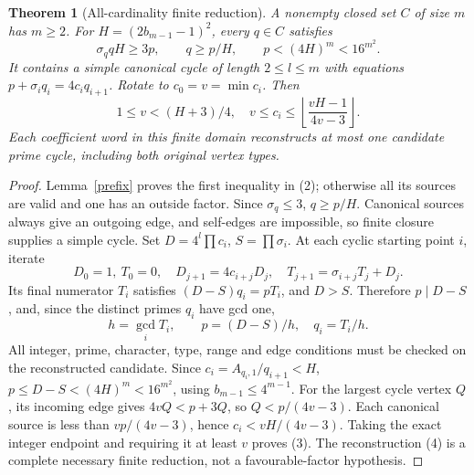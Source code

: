 \documentclass[11pt,reqno]{amsart}
\newtheorem{theorem}{Theorem}\newtheorem{lemma}[theorem]{Lemma}
\begin{document}
\begin{theorem}[All-cardinality finite reduction]\label{height}
A nonempty closed set $C$ of size $m$ has $m\ge2$. For
$H=(2b_{m-1}-1)^2$, every $q\in C$ satisfies
\[
 \boxed{\sigma_q qH\ge3p,\qquad q\ge p/H,\qquad p<(4H)^m<16^{m^2}.} \tag{2}
\]
It contains a simple canonical cycle of length $2\le l\le m$ with equations
$p+\sigma_iq_i=4c_iq_{i+1}$. Rotate to $c_0=v=\min c_i$. Then
\[
 \boxed{1\le v<(H+3)/4,\quad
 v\le c_i\le\left\lfloor\frac{vH-1}{4v-3}\right\rfloor.}          \tag{3}
\]
Each coefficient word in this finite domain reconstructs at most one candidate
prime cycle, including both original vertex types.
\end{theorem}
\begin{proof}
Lemma~\ref{prefix} proves the first inequality in (2); otherwise all its sources
are valid and one has an outside factor. Since $\sigma_q\le3$, $q\ge p/H$.
Canonical sources always give an outgoing edge, and self-edges are impossible,
so finite closure supplies a simple cycle. Set
$D=4^l\prod c_i$, $S=\prod\sigma_i$. At each cyclic starting point $i$, iterate
\[
 D_0=1,\ T_0=0,\quad
 D_{j+1}=4c_{i+j}D_j,\quad T_{j+1}=\sigma_{i+j}T_j+D_j.
\]
Its final numerator $T_i$ satisfies $(D-S)q_i=pT_i$, and $D>S$.
Therefore $p\mid D-S$, and, since the distinct primes $q_i$ have gcd one,
\[
 h=\gcd_iT_i,\qquad \boxed{p=(D-S)/h,\quad q_i=T_i/h.}            \tag{4}
\]
All integer, prime, character, type, range and edge conditions must be checked
on the reconstructed candidate. Since $c_i=A_{q_i,1}/q_{i+1}<H$,
$p\le D-S<(4H)^m<16^{m^2}$, using $b_{m-1}\le4^{m-1}$.
For the largest cycle vertex $Q$, its incoming edge gives
$4vQ<p+3Q$, so $Q<p/(4v-3)$. Each canonical source is less than $vp/(4v-3)$,
hence $c_i<vH/(4v-3)$. Taking the exact integer endpoint and requiring it at least
$v$ proves (3). The reconstruction (4) is a complete necessary finite reduction,
not a favourable-factor hypothesis.
\end{proof}
\end{document}
